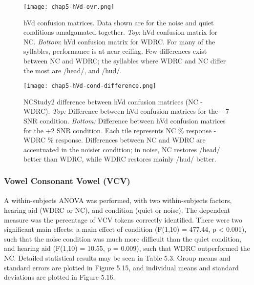 \begin{figure}[htp]
\begin{center}
\texttt{[image: chap5-hVd-ovr.png]} \\
\caption[NCStudy2 hVd overall confusion matrices]{hVd confusion matrices.  Data shown are for the noise and quiet conditions amalgamated together.  \emph{Top}: hVd confusion matrix for NC.  \emph{Bottom}: hVd confusion matrix for WDRC.  For many of the syllables, performance is at near ceiling.  Few differences exist between NC and WDRC; the syllables where WDRC and NC differ the most are /head/, and /hud/. }
\label{ch5-hVd-ovr}
\end{center}
\end{figure}

\clearpage

\begin{figure}[htp]
\begin{center}
\texttt{[image: chap5-hVd-cond-difference.png]} \\
\caption[NCStudy2 difference between hVd confusion matrices (NC - WDRC)]{NCStudy2 difference between hVd confusion matrices (NC - WDRC).  \emph{Top:} Difference between hVd confusion matrices for the +7 SNR condition.  \emph{Bottom:} Difference between hVd confusion matrices for the +2 SNR condition.  Each tile represents NC \% response - WDRC \% response.  Differences between NC and WDRC are accentuated in the noisier condition; in noise, NC restores /head/ better than WDRC, while WDRC restores mainly /hud/ better.}
\label{ch5-hVd-cond-difference}
\end{center}
\end{figure}

\subsubsection{Vowel Consonant Vowel (VCV)}
\paragraph{}A within-subjects ANOVA was performed, with two within-subjects factors, hearing aid (WDRC or NC), and condition (quiet or noise).  The dependent measure was the percentage of VCV tokens correctly identified.  There were two significant main effects; a main effect of condition (F(1,10) = 477.44, p < 0.001), such that the noise condition was much more difficult than the quiet condition, and hearing aid (F(1,10) = 10.55, p = 0.009), such that WDRC outperformed the NC.  Detailed statistical results may be seen in Table 5.3.  Group means and standard errors are plotted in Figure 5.15, and individual means and standard deviations are plotted in Figure 5.16.

